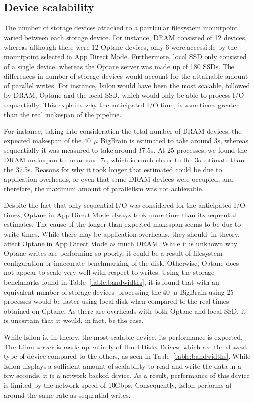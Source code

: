\documentclass[conference]{IEEEtran}
\newcommand{\bigbrain}{BigBrain\xspace}
\begin{document}
\subsection{Device scalability}
The number of storage devices attached to a particular filesystem mountpoint varied between
each storage device. For instance, DRAM consisted of 12 devices, whereas although there were 
12 Optane devices, only 6 were accessible by the mountpoint selected in App Direct Mode. Furthermore,
local SSD only consisted of a single device, whereas the Optane server was made up of 180 SSDs. The differences
in number of storage devices would account for the attainable amount of parallel writes. For instance, 
Isilon would have been the most scalable, followed by DRAM, Optane and the local SSD, which would
only be able to process I/O sequentially. This explains why the anticipated I/O time, is sometimes greater
than the real makespan of the pipeline.

For instance, taking into consideration the total number of DRAM devices, the expected makespan of the
40~$\mu$ \bigbrain is estimated to take around 3s, whereas sequentially it was measured to take
around 37.5s. At 25 processes, we found the DRAM makespan to be around 7s, which is much closer to the 3s
estimate than the 37.5s. Reasons for why it took longer that estimated could be due to application
overheads, or even that some DRAM devices were occupied, and therefore, the maximum amount of parallelism 
was not achievable. 

Despite the fact that only sequential I/O was considered for the anticipated I/O times, 
Optane in App Direct Mode always took more time than its sequential estimates. The cause
of the longer-than-expected makespan seems to be due to write times. While there may be application overheads,
they should, in theory, affect Optane in App Direct Mode as much DRAM. While it is unknown
why Optane writes are performing so poorly, it could be a result of filesystem configuration or 
inaccurate benchmarking of the disk. Otherwise, Optane does not appear to scale very well with respect to
writes. Using the storage benchmarks found in Table~\ref{table:bandwidths}, it is found that with an equivalent
number of storage devices, processing the 40~$\mu$ \bigbrain using 25 processes would be faster using
local disk when compared to the real times obtained on Optane. As there are overheads with both Optane and local
SSD, it is uncertain that it would, in fact, be the case.

While Isilon is, in theory, the most scalable device, its performance is expected. The Isilon
server is made up entirely of Hard Disks Drives, which are the slowest type of device compared to
the others, as seen in Table~\ref{table:bandwidths}. While Isilon displays a sufficient amount of
scalability to read and write the data in a few seconds, it is a network-backed device. As a result,
performance of this device is limited by the network speed of 10Gbps. Consequently, Isilon performs at around
the same rate as sequential writes.
\end{document}
